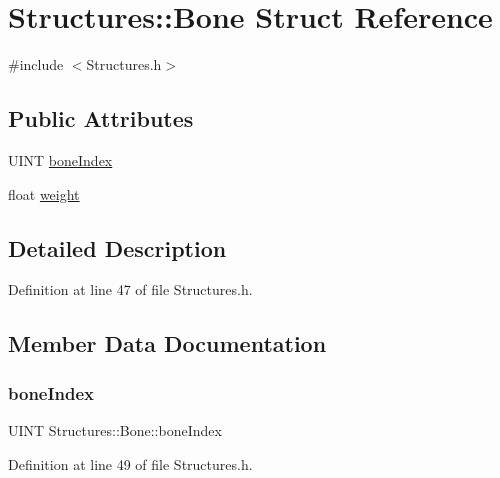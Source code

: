 \hypertarget{struct_structures_1_1_bone}{}\section{Structures\+:\+:Bone Struct Reference}
\label{struct_structures_1_1_bone}


{\ttfamily \#include $<$Structures.\+h$>$}

\subsection*{Public Attributes}
\begin{DoxyCompactItemize}
\item 
U\+I\+NT \mbox{\hyperlink{struct_structures_1_1_bone_a5f104f4857636f9f51697b425e67a924}{bone\+Index}}
\item 
float \mbox{\hyperlink{struct_structures_1_1_bone_ab3cfa9f0b6d5a647c993a73bddecd624}{weight}}
\end{DoxyCompactItemize}


\subsection{Detailed Description}


Definition at line 47 of file Structures.\+h.



\subsection{Member Data Documentation}
\mbox{\label{struct_structures_1_1_bone_a5f104f4857636f9f51697b425e67a924}} 
\subsubsection{\texorpdfstring{bone\+Index}{boneIndex}}
{\footnotesize\ttfamily U\+I\+NT Structures\+::\+Bone\+::bone\+Index}



Definition at line 49 of file Structures.\+h.

\mbox{\label{struct_structures_1_1_bone_ab3cfa9f0b6d5a647c993a73bddecd624}} 

